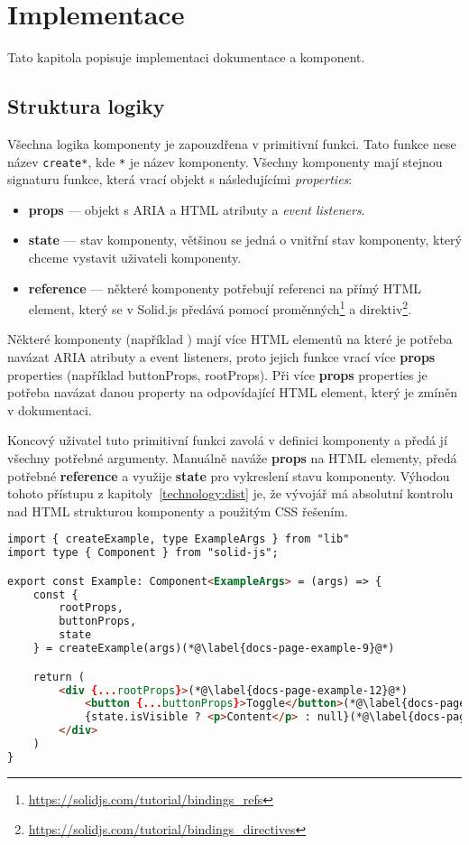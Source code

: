 \chapter{Implementace}

Tato kapitola popisuje implementaci dokumentace a komponent.

\section{Struktura logiky}\label{sec:structure}

Všechna logika komponenty je zapouzdřena v primitivní funkci.
Tato funkce nese název \texttt{create*}, kde \texttt{*} je název komponenty.
Všechny komponenty mají stejnou signaturu funkce, která vrací objekt s následujícími \textit{properties}:

\begin{itemize}
    \item \textbf{props} --- objekt s ARIA a HTML atributy a \textit{event listeners}.
    \item \textbf{state} --- stav komponenty, většinou se jedná o vnitřní stav komponenty, který chceme vystavit uživateli komponenty.
    \item \textbf{reference} --- některé komponenty potřebují referenci na přímý HTML element, který se v Solid.js předává pomocí proměnných\footnote{\url{https://solidjs.com/tutorial/bindings_refs}} a direktiv\footnote{\url{https://solidjs.com/tutorial/bindings_directives}}.
\end{itemize}

Některé komponenty (například ) mají více HTML elementů na které je potřeba navázat ARIA atributy a event listeners, proto jejich funkce vrací více \textbf{props} properties (například buttonProps, rootProps).
Při více \textbf{props} properties je potřeba navázat danou property na odpovídající HTML element, který je zmíněn v dokumentaci.

Koncový uživatel tuto primitivní funkci zavolá v definici komponenty a předá jí všechny potřebné argumenty.
Manuálně naváže \textbf{props} na HTML elementy, předá potřebné \textbf{reference} a využije \textbf{state} pro vykreslení stavu komponenty.
Výhodou tohoto přístupu z kapitoly~\ref{technology:dist} je, že vývojář má absolutní kontrolu nad HTML strukturou komponenty a použitým CSS řešením.
\clearpage

\begin{lstlisting}[caption={Příklad implementace komponenty pomocí primitivní funkce}, label={implementation-example}, language=html]
import { createExample, type ExampleArgs } from "lib"
import type { Component } from "solid-js";

export const Example: Component<ExampleArgs> = (args) => {
    const {
        rootProps,
        buttonProps,
        state
    } = createExample(args)(*@\label{docs-page-example-9}@*)

    return (
        <div {...rootProps}>(*@\label{docs-page-example-12}@*)
            <button {...buttonProps}>Toggle</button>(*@\label{docs-page-example-13}@*)
            {state.isVisible ? <p>Content</p> : null}(*@\label{docs-page-example-14}@*)
        </div>
    )
}
\end{lstlisting}

